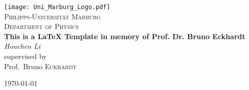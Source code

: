 
\begin{titlepage}
\centering
\texttt{[image: Uni\_Marburg\_Logo.pdf]}\\
\vspace{1cm}
{\scshape\LARGE Philipps-Universit\"at Marburg}\\
\vspace{1cm}
{\scshape\Large Department of Physics}\\
\vspace{2cm}
{\huge\bfseries This is a \LaTeX{} Template in memory of Prof. Dr. Bruno Eckhardt}\\
\vfill
{\Large\itshape Houchen Li}\\
\vspace{2cm}
supervised by\\
Prof.~Bruno \textsc{Eckhardt}\\
\vspace{2cm}
{\large \today\par}
\end{titlepage}

\restoregeometry
